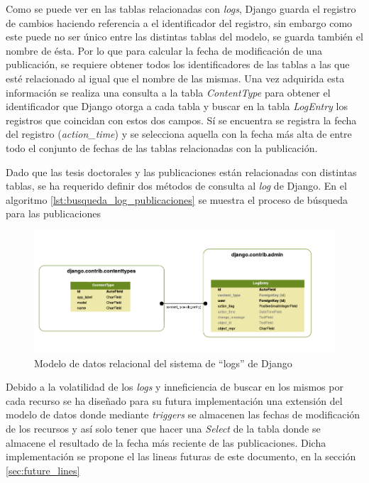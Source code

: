 Como se puede ver en las tablas relacionadas con \textit{logs}, Django guarda el registro de cambios haciendo referencia a el identificador del registro, sin embargo como este puede no ser único entre las distintas tablas del modelo, se guarda también el nombre de ésta. Por lo que para calcular la fecha de modificación de una publicación, se requiere obtener todos los identificadores de las tablas a las que esté relacionado al igual que el nombre de las mismas. Una vez adquirida esta información se realiza una consulta a la tabla \textit{ContentType} para obtener el identificador que Django otorga a cada tabla y buscar en la tabla \textit{LogEntry} los registros que coincidan con estos dos campos. Sí se encuentra se registra la fecha del registro (\textit{action\_time}) y se selecciona aquella con la fecha más alta de entre todo el conjunto de fechas de las tablas relacionadas con la publicación.

Dado que las tesis doctorales y las publicaciones están relacionadas con distintas tablas, se ha requerido definir dos métodos de consulta al \textit{log} de Django. En el algoritmo \ref{lst:busqueda_log_publicaciones} se muestra el proceso de búsqueda para las publicaciones

\begin{figure}[!htbp]
	\centering
	\includegraphics[scale=0.45]{fig/dbmodel/django_log}
	\caption{Modelo de datos relacional del sistema de ``logs'' de Django}
	\label{fig:logsmodel}
\end{figure}



Debido a la volatilidad de los \textit{logs} y inneficiencia de buscar en los mismos por cada recurso se ha diseñado para su futura implementación una extensión del modelo de datos donde mediante \textit{triggers} se almacenen las fechas de modificación de los recursos  y así solo tener que hacer una \textit{Select} de la tabla donde se almacene el resultado de la fecha más reciente de las publicaciones.
Dicha implementación se propone el las lineas futuras de este documento, en la sección \ref{sec:future_lines}

